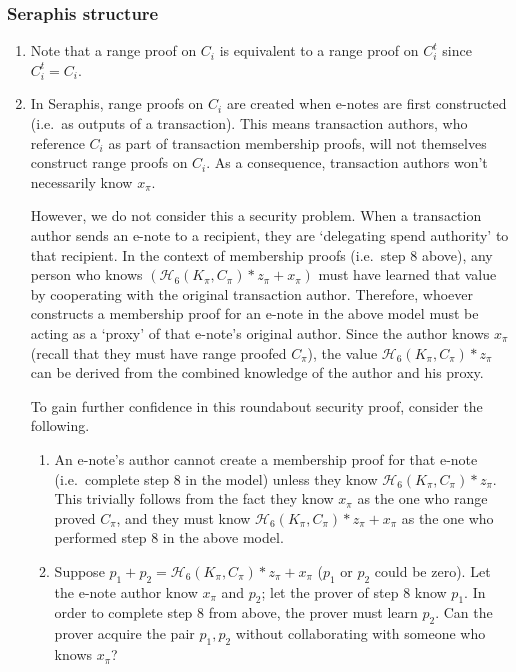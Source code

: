 \begin{appendices}
\subsubsection{Seraphis structure}

\begin{enumerate}
    \item Note that a range proof on $C_i$ is equivalent to a range proof on $C^t_i$ since $C^t_i = C_i$.

    \item In Seraphis, range proofs on $C_i$ are created when e-notes are first constructed (i.e.\ as outputs of a transaction). This means transaction authors, who reference $C_i$ as part of transaction membership proofs, will not themselves construct range proofs on $C_i$. As a consequence, transaction authors won't necessarily know $x_{\pi}$.

    However, we do not consider this a security problem. When a transaction author sends an e-note to a recipient, they are `delegating spend authority' to that recipient. In the context of membership proofs (i.e.\ step 8 above), any person who knows $(\mathcal{H}_6(K_{\pi}, C_{\pi})*z_{\pi} + x_{\pi})$ must have learned that value by cooperating with the original transaction author. Therefore, whoever constructs a membership proof for an e-note in the above model must be acting as a `proxy' of that e-note's original author. Since the author knows $x_{\pi}$ (recall that they must have range proofed $C_{\pi}$), the value $\mathcal{H}_6(K_{\pi}, C_{\pi})*z_{\pi}$ can be derived from the combined knowledge of the author and his proxy.

    To gain further confidence in this roundabout security proof, consider the following.
    \begin{enumerate}
        \item An e-note's author cannot create a membership proof for that e-note (i.e.\ complete step 8 in the model) unless they know $\mathcal{H}_6(K_{\pi}, C_{\pi})*z_{\pi}$. This trivially follows from the fact they know $x_{\pi}$ as the one who range proved $C_{\pi}$, and they must know $\mathcal{H}_6(K_{\pi}, C_{\pi})*z_{\pi} + x_{\pi}$ as the one who performed step 8 in the above model.

        \item Suppose $p_1 + p_2 = \mathcal{H}_6(K_{\pi}, C_{\pi})*z_{\pi} + x_{\pi}$ ($p_1$ or $p_2$ could be zero). Let the e-note author know $x_{\pi}$ and $p_2$; let the prover of step 8 know $p_1$. In order to complete step 8 from above, the prover must learn $p_2$. Can the prover acquire the pair $p_1, p_2$ without collaborating with someone who knows $x_{\pi}$?


\end{enumerate}
\end{enumerate}
\end{appendices}
